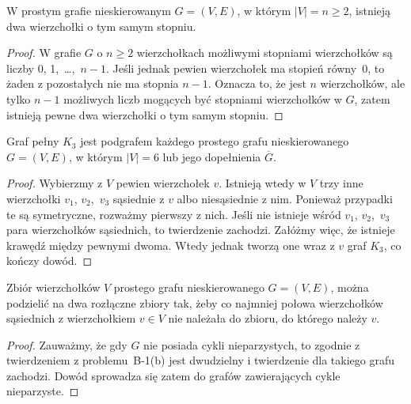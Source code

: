\subproblem %
\begin{twierdzenie}
	W prostym grafie nieskierowanym $G=(V,E)$, w którym $|V|=n\ge2$, istnieją dwa wierzchołki o tym samym stopniu.
\end{twierdzenie}
\begin{proof}
W grafie $G$ o $n\ge2$ wierzchołkach możliwymi stopniami wierzchołków są liczby 0, 1,~\dots,~$n-1$. Jeśli jednak pewien wierzchołek ma stopień równy~0, to żaden z pozostałych nie ma stopnia $n-1$. Oznacza to, że jest $n$ wierzchołków, ale tylko $n-1$ możliwych liczb mogących być stopniami wierzchołków w $G$, zatem istnieją pewne dwa wierzchołki o tym samym stopniu.
\end{proof}

\subproblem %
\begin{twierdzenie}
	Graf pełny $K_3$ jest podgrafem każdego prostego grafu nieskierowanego $G=(V,E)$, w którym $|V|=6$ lub jego dopełnienia $\overline{G}$.
\end{twierdzenie}
\begin{proof}
Wybierzmy z $V$ pewien wierzchołek $v$. Istnieją wtedy w $V$ trzy inne wierzchołki $v_1$, $v_2$,~$v_3$ sąsiednie z $v$ albo niesąsiednie z nim. Ponieważ przypadki te są symetryczne, rozważmy pierwszy z nich. Jeśli nie istnieje wśród $v_1$, $v_2$,~$v_3$ para wierzchołków sąsiednich, to twierdzenie zachodzi. Załóżmy więc, że istnieje krawędź między pewnymi dwoma. Wtedy jednak tworzą one wraz z $v$ graf $K_3$, co kończy dowód.
\end{proof}

\subproblem %
\begin{twierdzenie}
	Zbiór wierzchołków $V$ prostego grafu nieskierowanego $G=(V,E)$, można podzielić na dwa rozłączne zbiory tak, żeby co najmniej połowa wierzchołków sąsiednich z wierzchołkiem $v\in V$ nie należała do zbioru, do którego należy $v$.
\end{twierdzenie}
\begin{proof}
Zauważmy, że gdy $G$ nie posiada cykli nieparzystych, to zgodnie z twierdzeniem z problemu~B-1(b) jest dwudzielny i twierdzenie dla takiego grafu zachodzi. Dowód sprowadza się zatem do grafów zawierających cykle nieparzyste.


\end{proof}

